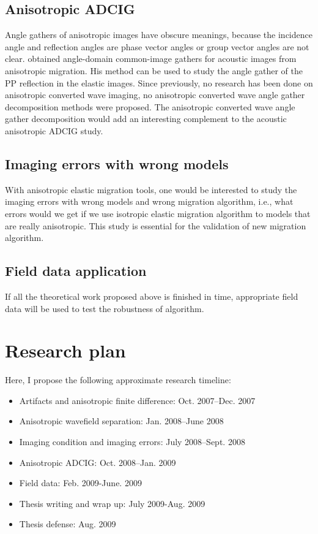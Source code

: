 \subsection{Anisotropic ADCIG}
Angle gathers of anisotropic images have obscure meanings, because the incidence angle and reflection angles are phase vector angles or group vector angles are not clear. \cite{biondi:S81} obtained angle-domain common-image gathers for acoustic images from anisotropic migration. His method can be used to study the angle gather of the PP reflection in the elastic images. Since previously, no research has been done on anisotropic converted wave imaging, no anisotropic converted wave angle gather decomposition methods were proposed. The anisotropic converted wave angle gather decomposition would add an interesting complement to the acoustic anisotropic ADCIG study.


\subsection{Imaging errors with wrong models}
With anisotropic elastic migration tools, one would be interested to study the imaging errors with wrong models and wrong migration algorithm, i.e., what errors would we get if we use isotropic elastic migration algorithm to models that are really anisotropic. This study is essential for the validation of new migration algorithm.

\subsection{Field data application}
If all the theoretical work proposed above is finished in time, appropriate field data will be used to test the robustness of algorithm.


\section{Research plan}
Here, I propose the following approximate research timeline:
\begin{itemize}
\item Artifacts and anisotropic finite difference: Oct. 2007--Dec. 2007
\item Anisotropic wavefield separation: Jan. 2008--June 2008
\item Imaging condition and imaging errors: July 2008--Sept. 2008
\item Anisotropic ADCIG: Oct. 2008--Jan. 2009
\item Field data: Feb. 2009-June. 2009
\item Thesis writing and wrap up: July 2009-Aug. 2009
\item Thesis defense: Aug. 2009
\end{itemize}



\newpage
{}

%


